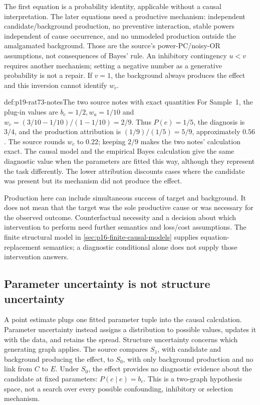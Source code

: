 The first equation is a probability identity, applicable without a causal
interpretation. The later equations need a productive mechanism:
independent candidate/background production, no preventive interaction,
stable powers independent of cause occurrence, and no unmodeled production
outside the amalgamated background. Those are the source's power-PC/noisy-OR
assumptions, not consequences of Bayes' rule. An inhibitory contingency
\(u<v\) requires another mechanism; setting a negative number as a
generative probability is not a repair. If \(v=1\), the background always
produces the effect and this inversion cannot identify \(w_c\).
\cite[sec.~2.2, eqs.~(2)--(3), p.~451]{MederMayrhofer2021DiagnosticCausal}
\cite[pp.~279--280]{MederMayrhoferWaldmann2014StructureInduction}

\begin{hbexample}{def:p19-rat73-notes}{The two source notes with exact quantities}
For Sample~1, the plug-in values are \(b_c=1/2,w_a=1/10\) and
\(w_c=(3/10-1/10)/(1-1/10)=2/9\).
Thus \(P(e)=1/5\), the diagnosis is \(3/4\), and the production
attribution is \((1/9)/(1/5)=5/9\), approximately \(0.56\).
The source rounds \(w_c\) to \(0.22\); keeping \(2/9\) makes
the two notes' calculation exact. The causal model and the empirical
Bayes calculation give the same diagnostic value when the parameters
are fitted this way, although they represent the task differently.
The lower attribution discounts cases where the candidate was present
but its mechanism did not produce the effect.
\cite[notes~1--2, pp.~454--455]{MederMayrhofer2021DiagnosticCausal}
\end{hbexample}

Production here can include simultaneous success of target and background.
It does not mean that the target was the sole productive cause or was
necessary for the observed outcome. Counterfactual necessity and a decision
about which intervention to perform need further semantics and loss/cost
assumptions. The finite structural model in
\cref{sec:p16-finite-causal-models} supplies equation-replacement semantics;
a diagnostic conditional alone does not supply those intervention answers.

\subsection{Parameter uncertainty is not structure uncertainty}

A point estimate plugs one fitted parameter tuple into the causal
calculation. Parameter uncertainty instead assigns a distribution to
possible values, updates it with the data, and retains the spread.
Structure uncertainty concerns which generating graph applies.
The source compares \(S_1\), with candidate and background producing
the effect, to \(S_0\), with only background production and no link
from \(C\) to \(E\). Under \(S_0\), the effect provides no diagnostic
evidence about the candidate at fixed parameters: \(P(c\mid e)=b_c\).
This is a two-graph hypothesis space, not a search over every possible
confounding, inhibitory or selection mechanism.
\cite[sec.~2.3, pp.~451--452]{MederMayrhofer2021DiagnosticCausal}

